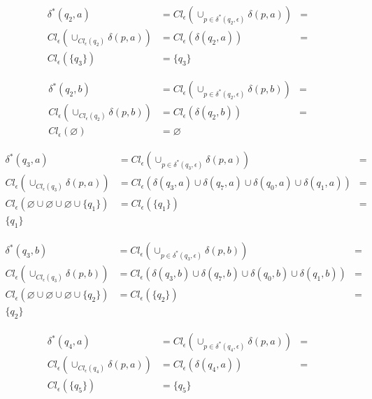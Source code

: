 \documentclass{article}
\begin{document}
\begin{enumerate}
{\begin{enumerate}
{					\begin{align*}
					\delta^{*} (q_{2},a)&=
					Cl_{\epsilon} (\cup_{p \in \delta^{*} (q_{2}, \epsilon)}	\delta (p,a)) &=\\
					Cl_{\epsilon} (\cup_{Cl_{\epsilon} (q_{2})}	\delta (p,a)) &=
					Cl_{\epsilon} ( \delta(q_{2},a)) &=\\
					Cl_{\epsilon} (\{q_{3}\}) &=
					\{q_{3}\}
					\end{align*}
					
					\begin{align*}
					\delta^{*} (q_{2},b)&=
					Cl_{\epsilon} (\cup_{p \in \delta^{*} (q_{2}, \epsilon)}	\delta (p,b)) &=\\
					Cl_{\epsilon} (\cup_{Cl_{\epsilon} (q_{2})}	\delta (p,b)) &=
					Cl_{\epsilon} ( \delta(q_{2},b)) &=\\
					Cl_{\epsilon} (\varnothing) &=
					\varnothing
					\end{align*}
					
					\begin{align*}
					\delta^{*} (q_{3},a)&=
					Cl_{\epsilon} (\cup_{p \in \delta^{*} (q_{3}, \epsilon)}	\delta (p,a)) &=\\
					Cl_{\epsilon} (\cup_{Cl_{\epsilon} (q_{3})}	\delta (p,a)) &=
					Cl_{\epsilon} ( \delta(q_{3},a) \cup \delta(q_{7},a) \cup \delta(q_{0},a) \cup \delta(q_{1},a)) &=\\
					Cl_{\epsilon} ( \varnothing \cup \varnothing \cup \varnothing \cup \{q_{1}\}) &=
					Cl_{\epsilon} (\{q_{1}\}) &=\\
					\{q_{1}\}
					\end{align*}
					
					\begin{align*}
					\delta^{*} (q_{3},b)&=
					Cl_{\epsilon} (\cup_{p \in \delta^{*} (q_{3}, \epsilon)}	\delta (p,b)) &=\\
					Cl_{\epsilon} (\cup_{Cl_{\epsilon} (q_{3})}	\delta (p,b)) &=
					Cl_{\epsilon} ( \delta(q_{3},b) \cup \delta(q_{7},b) \cup \delta(q_{0},b) \cup \delta(q_{1},b)) &=\\
					Cl_{\epsilon} ( \varnothing \cup \varnothing \cup \varnothing \cup \{q_{2}\}) &=
					Cl_{\epsilon} (\{q_{2}\}) &=\\
					\{q_{2}\}
					\end{align*}
					
					\begin{align*}
					\delta^{*} (q_{4},a)&=
					Cl_{\epsilon} (\cup_{p \in \delta^{*} (q_{4}, \epsilon)}	\delta (p,a)) &=\\
					Cl_{\epsilon} (\cup_{Cl_{\epsilon} (q_{4})}	\delta (p,a)) &=
					Cl_{\epsilon} ( \delta(q_{4},a)) &=\\
					Cl_{\epsilon} (\{q_{5}\}) &=
					\{q_{5}\}
					\end{align*}
					
}
\end{enumerate}}
\end{enumerate}
\end{document}
